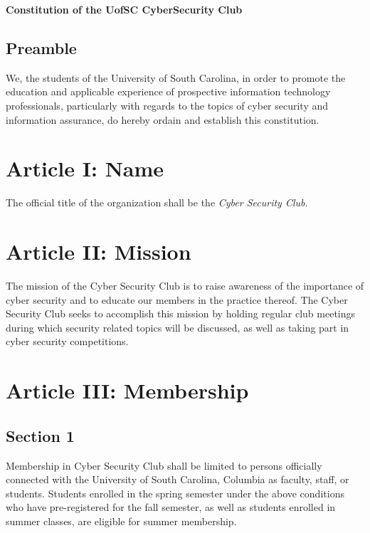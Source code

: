 \documentclass[10pt]{article}
\author{UofSC CyberSec VP, 2020}
\begin{document}
\begin{center}
\Large\textbf{Constitution of the UofSC CyberSecurity Club}
\newline
\end{center}

\subsection*{Preamble}
We, the students of the University of South Carolina, in order to promote the education and applicable
experience of prospective information technology professionals, particularly with regards to the topics of cyber security and
information assurance, do hereby ordain and establish this constitution.
\vspace{0.1in}
\section*{Article I: Name}
The official title of the organization shall be the \textit{Cyber Security Club}.
\vspace{0.2in}

\section*{Article II: Mission}
The mission of the Cyber Security Club is to raise awareness of the importance of cyber security and to
educate our members in the practice thereof. The Cyber Security Club seeks to accomplish this mission
by holding regular club meetings during which security related topics will be discussed, as well as
taking part in cyber security competitions.
\vspace{0.2in}

\section*{Article III: Membership}
\subsection*{Section 1}
Membership in Cyber Security Club shall be limited to persons officially connected with the University
of South Carolina, Columbia as faculty, staff, or students. Students enrolled in the spring semester
under the above conditions who have pre-registered for the fall semester, as well as students enrolled in
summer classes, are eligible for summer membership.
\end{document}
